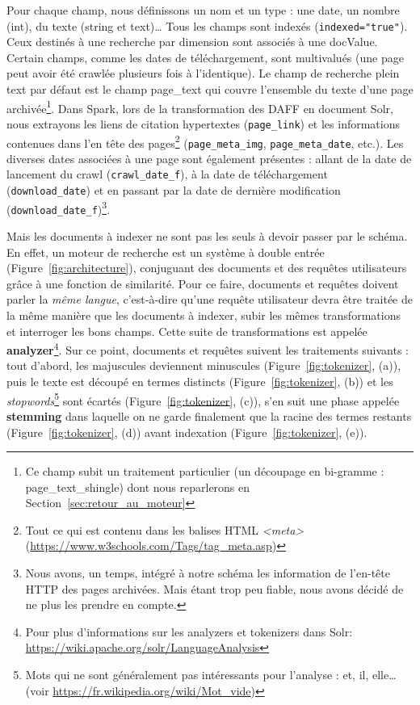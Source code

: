\documentclass[symmetric,justified,marginals=raggedouter]{tufte-book}
\begin{document}
\noindent Pour chaque champ, nous définissons un nom et un type : une date, un nombre (int), du texte (string et text)\ldots{} Tous les champs sont indexés (\texttt{indexed="true"}). Ceux destinés à une recherche par dimension sont associés à une docValue. Certain champs, comme les dates de téléchargement, sont multivalués (une page peut avoir été crawlée plusieurs fois à l'identique). Le champ de recherche plein text par défaut est le champ page\_text qui couvre l'ensemble du texte d'une page archivée\footnote{\RaggedOuter Ce champ subit un traitement particulier (un découpage en bi-gramme : page\_text\_shingle) dont nous reparlerons en Section~\ref{sec:retour_au_moteur}}. Dans Spark, lors de la transformation des DAFF en document Solr, nous extrayons les liens de citation hypertextes (\texttt{page\_link}) et les informations contenues dans l'en tête des pages\footnote{\RaggedOuter Tout ce qui est contenu dans les balises HTML \textit{<meta>} (\url{https://www.w3schools.com/Tags/tag_meta.asp})} (\texttt{page\_meta\_img}, \texttt{page\_meta\_date}, etc.). Les diverses dates associées à une page sont également présentes : allant de la date de lancement du crawl (\texttt{crawl\_\-date\_f}), à la date de téléchargement (\texttt{download\_date}) et en passant par la date de dernière modification (\texttt{download\_date\_f})\footnote{\RaggedOuter Nous avons, un temps, intégré à notre schéma les information de l'en-tête HTTP des pages archivées. Mais étant trop peu fiable, nous avons décidé de ne plus les prendre en compte.}.

Mais les documents à indexer ne sont pas les seuls à devoir passer par le schéma. En effet, un moteur de recherche est un système à double entrée (Figure~\ref{fig:architecture}), conjuguant des documents et des requêtes utilisateurs grâce à une fonction de similarité. Pour ce faire, documents et requêtes doivent parler la \textit{même langue}, c'est-à-dire qu'une requête utilisateur devra être traitée de la même manière que les documents à indexer, subir les mêmes transformations et interroger les bons champs. Cette suite de transformations est appelée \textbf{analyzer}\footnote{\RaggedOuter Pour plus d'informations sur les analyzers et tokenizers dans Solr: \url{https://wiki.apache.org/solr/LanguageAnalysis}}. Sur ce point, documents et requêtes suivent les traitements suivants : tout d'abord, les majuscules deviennent minuscules (Figure~\ref{fig:tokenizer}, (a)), puis le texte est découpé en termes distincts (Figure~\ref{fig:tokenizer}, (b)) et les \textit{stopwords}\footnote{\RaggedOuter Mots qui ne sont généralement pas intéressants pour l'analyse : et, il, elle\ldots{} (voir \url{https://fr.wikipedia.org/wiki/Mot_vide})} sont écartés (Figure~\ref{fig:tokenizer}, (c)), s'en suit une phase appelée \textbf{stemming} dans laquelle on ne garde finalement que la racine des termes restants (Figure~\ref{fig:tokenizer}, (d)) avant indexation (Figure~\ref{fig:tokenizer}, (e)).
\end{document}
